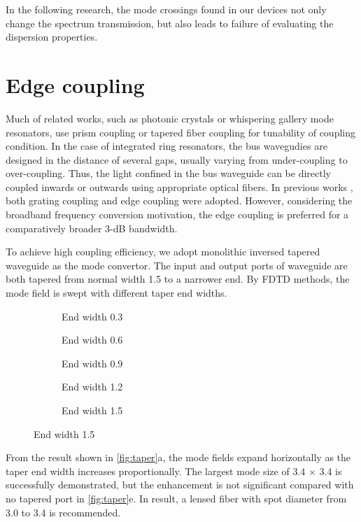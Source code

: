 In the following research, the mode crossings found in our devices not only change the spectrum transmission, but also leads to failure of evaluating the dispersion properties.


\section{Edge coupling}
Much of related works, such as photonic crystals or whispering gallery mode resonators, use prism coupling or tapered fiber coupling for tunability of coupling condition. 
In the case of integrated ring resonators, the bus wavegudies are designed in the distance of several gaps, usually varying from under-coupling to over-coupling. 
Thus, the light confined in the bus waveguide can be directly coupled inwards or outwards using appropriate optical fibers. 
In previous works \cite{Sunada2018}, both grating coupling and edge coupling were adopted. However, considering the broadband frequency conversion motivation, the edge coupling is preferred for a comparatively broader 3-dB bandwidth.

To achieve high coupling efficiency, we adopt monolithic inversed tapered waveguide as the mode convertor. The input and output ports of waveguide are both tapered from normal width 1.5 \um to a narrower end. By FDTD methods, the mode field is swept with different taper end widths.

\begin{figure}
	\centering
	\begin{subfigure}[b]{0.33\textwidth}
		
		\caption{End width 0.3 \um}
	\end{subfigure}\hfill
	\begin{subfigure}[b]{0.33\textwidth}
		
		\caption{End width 0.6 \um}
	\end{subfigure}\hfill
	\begin{subfigure}[b]{0.33\textwidth}
		
		\caption{End width 0.9 \um}
	\end{subfigure}
	\vfill
	\begin{subfigure}[b]{0.33\textwidth}
		
		\caption{End width 1.2 \um}
	\end{subfigure}
	\begin{subfigure}[b]{0.33\textwidth}
		
		\caption{End width 1.5 \um}
	\end{subfigure}
	\label{fig:taper}
\end{figure}

From the result shown in \autoref{fig:taper}a, the mode fields expand horizontally as the taper end width increases proportionally. The largest mode size of 3.4 \um $\times$ 3.4 \um is successfully demonstrated, but the enhancement is not significant compared with no tapered port in \autoref{fig:taper}e. In result, a lensed fiber with spot diameter from 3.0 \um to 3.4 \um is recommended. 



